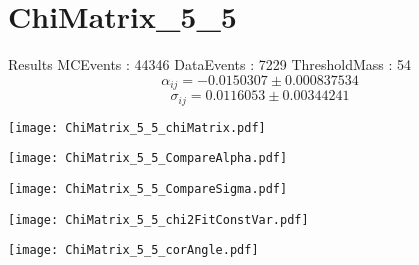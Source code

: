 \documentclass[a4paper,12pt]{article}
\begin{document}
\section{ChiMatrix\_5\_5}
\begin{minipage}{0.49\linewidth} Results \newline
MCEvents : 44346\newline
DataEvents : 7229 \newline
ThresholdMass : 54\\
$$\alpha_{ij} = -0.0150307\pm 0.000837534$$
$$\sigma_{ij} = 0.0116053\pm 0.00344241$$
\end{minipage}\hfill
\begin{minipage}{0.49\linewidth} 
\texttt{[image: ChiMatrix\_5\_5\_chiMatrix.pdf]}\\
\end{minipage}
\hfill
\begin{minipage}{0.49\linewidth} 
\texttt{[image: ChiMatrix\_5\_5\_CompareAlpha.pdf]}\\
\end{minipage}
\hfill
\begin{minipage}{0.49\linewidth} 
\texttt{[image: ChiMatrix\_5\_5\_CompareSigma.pdf]}\\
\end{minipage}
\begin{minipage}{0.49\linewidth} 
\texttt{[image: ChiMatrix\_5\_5\_chi2FitConstVar.pdf]}\\
\end{minipage}
\hfill
\begin{minipage}{0.49\linewidth} 
\texttt{[image: ChiMatrix\_5\_5\_corAngle.pdf]}\\
\end{minipage}
\end{document}
